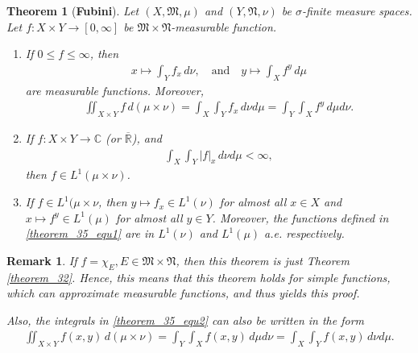 \documentclass[11pt]{book}
\newtheorem{theorem}{Theorem}[chapter]
\newtheorem{remark}{Remark}[chapter]
\theoremstyle{definition}
\numberwithin{equation}{chapter}
\begin{document}
\begin{theorem}[{\bf Fubini}]
Let $(X,\mathfrak{M},\mu)$ and $(Y,\mathfrak{N},\nu)$ be $\sigma$-finite measure spaces. Let $f: X \times Y \to [0,\infty]$ be $\mathfrak{M} \times \mathfrak{N}$-measurable function.
\begin{enumerate}[label=(\alph*)]
    \item If $0 \leq f \leq \infty$, then 
    \begin{align}\label{theorem_35_equ1}
        x \mapsto \int_Y f_x\, d\nu, \quad \text{and} \quad y \mapsto \int_X f^y\, d\mu
    \end{align}
    are measurable functions. Moreover,
    \begin{align}\label{theorem_35_equ2}
        \iint_{X \times Y} f\,d(\mu\times\nu)  = \int_X \int_Y f_x \, d\nu d\mu = \int_Y \int_X f^y \, d\mu d\nu.
    \end{align}
    
    \item If $f: X \times Y \to \mathbb{C}$ (or $\overline{\mathbb{R}}$), and
    \begin{align*}
        \int_X \int_Y \left|f\right|_x \, d\nu d\mu < \infty,
    \end{align*}
    then $f \in L^1(\mu \times \nu)$.
    
    \item If $f \in L^1(\mu \times \nu$, then $y \mapsto f_x \in L^1(\nu)$ for almost all $x\in X$ and $x \mapsto f^y \in L^1(\mu)$ for almost all $y \in Y$. Moreover, the functions defined in \eqref{theorem_35_equ1} are in $L^1(\nu)$ and $L^1(\mu)$ a.e. respectively.
\end{enumerate}

\end{theorem}

\begin{remark}
If $f = \chi_E, E \in \mathfrak{M} \times \mathfrak{N}$, then this theorem is just Theorem \ref{theorem_32}. Hence, this means that this theorem holds for simple functions, which can approximate measurable functions, and thus yields this proof. 

Also, the integrals in \eqref{theorem_35_equ2} can also be written in the form
\begin{align*}
    \iint_{X \times Y} f(x,y)\,d(\mu\times\nu) = \int_Y \int_X f(x,y) \, d\mu d\nu = \int_X \int_Y f(x,y) \, d\nu d\mu.
\end{align*}
\end{remark}
\end{document}
